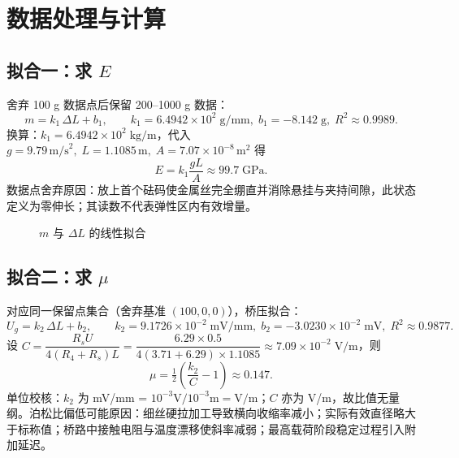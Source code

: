 \documentclass[12pt,a4paper]{article}
\begin{document}
\section{数据处理与计算}
\subsection*{拟合一：求 $E$}
舍弃 100 g 数据点后保留 200--1000 g 数据：
\[
 m = k_1\,\Delta L + b_1, \qquad k_1 = 6.4942\times10^{2}\;\text{g/mm},\; b_1 = -8.142\;\text{g},\; R^2\approx 0.9989.
\]
换算：$k_1=6.4942\times10^{2}\;\text{kg/m}$，代入 $g=9.79\,\text{m/s}^2,\;L=1.1085\,\text{m},\;A=7.07\times10^{-8}\,\text{m}^2$ 得
\[
 E = k_1\frac{gL}{A} \approx 99.7\;\text{GPa}.
\]
数据点舍弃原因：放上首个砝码使金属丝完全绷直并消除悬挂与夹持间隙，此状态定义为零伸长；其读数不代表弹性区内有效增量。

\begin{figure}[htbp]
\centering
{}
\caption{$m$ 与 $\Delta L$ 的线性拟合}\label{fig:fit_E}
\end{figure}

\subsection*{拟合二：求 $\mu$}
对应同一保留点集合（舍弃基准 $(100,0,0)$），桥压拟合：
\[
 U_g = k_2\,\Delta L + b_2, \qquad k_2 = 9.1726\times10^{-2}\;\text{mV/mm},\; b_2 = -3.0230\times10^{-2}\;\text{mV},\; R^2\approx 0.9877.
\]
设 $C=\dfrac{R_s U}{4(R_4+R_s) L}=\dfrac{6.29\times0.5}{4(3.71+6.29)\times1.1085}\approx7.09\times10^{-2}\;\text{V/m}$，则
\[
 \mu = \tfrac{1}{2}\left(\frac{k_2}{C}-1\right) \approx 0.147.
\]
单位校核：$k_2$ 为 mV/mm = $10^{-3}\text{V}/10^{-3}\text{m}=\text{V/m}$；$C$ 亦为 V/m，故比值无量纲。泊松比偏低可能原因：细丝硬拉加工导致横向收缩率减小；实际有效直径略大于标称值；桥路中接触电阻与温度漂移使斜率减弱；最高载荷阶段稳定过程引入附加延迟。
\end{document}
